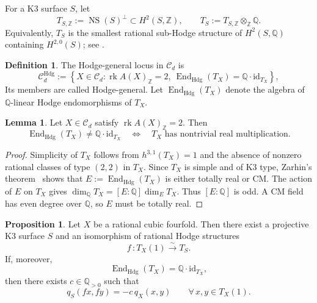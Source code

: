 \documentclass[10pt]{amsart}
\numberwithin{equation}{section}
\theoremstyle{definition}
\newtheorem{proposition}[theorem]{Proposition}
\newtheorem{lemma}[theorem]{Lemma}
\newtheorem{definition}[theorem]{Definition}
\theoremstyle{plain}
\numberwithin{theorem}{section}
\newcommand{\Q}{\mathbb{Q}}
\newcommand{\Z}{\mathbb{Z}}
\newcommand{\id}{\mathrm{id}}
\newcommand{\End}{\operatorname{End}}
\newcommand{\rk}{\operatorname{rk}}
\begin{document}
For a K3 surface $S$, let 
\[
T_{S,\Z}:=\operatorname{NS}(S)^\perp\subset H^2(S,\Z),
\qquad
T_S:=T_{S,\Z}\otimes_{\Z}\Q.\]
Equivalently, $T_S$ is the smallest rational sub-Hodge structure of $H^2(S,\Q)$ containing $H^{2,0}(S)$; see \cite[Definition~3.2.5]{lecturesHuybrechts}.

\begin{definition}\label{def:hg}
The Hodge-general locus in $\mathcal C_d$ is
\[
\mathcal{C}_d^{\mathrm{Hdg}} := \left\{ X\in\mathcal{C}_d: \operatorname{rk} A(X)_{\Z}=2,\ \operatorname{End}_{\mathrm{Hdg}}(T_{X}) =\mathbb{Q}\cdot\mathrm{id}_{T_X} \right\},
\]
Its members are called Hodge-general.
Let $\End_{\mathrm{Hdg}}(T_{X})$ denote the algebra of
$\Q$-linear Hodge endomorphisms of $T_{X}$.
\end{definition}
 
\begin{lemma}\label{lem:rm}
Let \(X\in\mathcal C_d\) satisfy $\rk A(X)_{\Z}=2$.  Then
\[
\End_{\mathrm{Hdg}}(T_X)\neq \mathbb Q\cdot\id_{T_X}
\quad\Longleftrightarrow\quad
T_X \text{ has nontrivial real multiplication}.
\]
\end{lemma}

\begin{proof}
Simplicity of \(T_X\) follows
from \(h^{3,1}(T_X)=1\) and the absence of nonzero rational classes of
type \((2,2)\) in \(T_X\). Since \(T_X\) is simple and of K3 type,
Zarhin's theorem~\cite[Theorems~1.5.1 and~1.6(a)]{Zarhin1983} shows that $E:=\operatorname{End}_{\mathrm{Hdg}}(T_X)$ is either totally
real or CM. The action of $E$ on $T_X$ gives $\dim_{\Q}T_X=[E:\Q]\dim_E T_X$.  Thus $[E:\Q]$ is odd. A CM field has even degree over $\Q$, so $E$ must be totally real. 
\end{proof}
 




\begin{proposition}\label{prop:source}
Let $X$ be a rational cubic fourfold. Then there exist a projective K3 surface $S$ and an isomorphism of rational Hodge structures
$$
f\,\colon T_X(1)\xrightarrow{\sim}T_S.
$$
If, moreover, 
$$\operatorname{End}_{\mathrm{Hdg}}(T_{X}) =\mathbb{Q}\cdot\mathrm{id}_{T_X},$$
then there exists $c\in\Q_{>0}$ such that
\begin{equation}\label{eq:similitude}
q_S(fx,fy)=-c\,q_X(x,y)\qquad \forall\,x,y\in T_X(1).
\end{equation}
\end{proposition}
\end{document}
